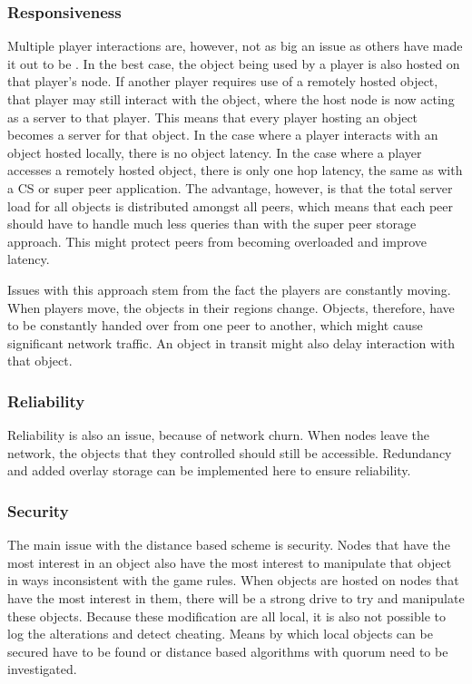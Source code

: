 \documentclass[10pt,a4paper,journal,cspaper,compsoc]{IEEEtran}
\begin{document}
\subsubsection{Responsiveness}
Multiple player interactions are, however, not as big an issue as others have made it out to be \cite{Fan_deisgn_issues_p2p}. In the best case, the
object being used by a player is also hosted on that player's node. If another player requires use of a remotely hosted object, that player may still
interact with the object, where the host node is now acting as a server to that player. This means that every player hosting an object becomes a
server for that object. In the case where a player interacts with an object hosted locally, there is no object latency. In the case where a player
accesses a remotely hosted object, there is only one hop latency, the same as with a \ac{CS} or super peer application. The advantage, however, is
that the total server load for all objects is distributed amongst all peers, which means that each peer should have to handle much less queries than
with the super peer storage approach. This might protect peers from becoming overloaded and improve latency.

Issues with this approach stem from the fact the players are constantly moving. When players move, the objects in their regions change. Objects,
therefore, have to be constantly handed over from one peer to another, which might cause significant network traffic. An object in transit might also
delay interaction with that object.

\subsubsection{Reliability}
Reliability is also an issue, because of network churn. When nodes leave the network, the objects that they controlled should still be accessible.
Redundancy and added overlay storage can be implemented here to ensure reliability.

\subsubsection{Security}
\label{distance_based_storage_security}

The main issue with the distance based scheme is security. Nodes that have the most interest in an object also have the most interest to manipulate
that object in ways inconsistent with the game rules. When objects are hosted on nodes that have the most interest in them, there will be a strong
drive to try and manipulate these objects. Because these modification are all local, it is also not possible to log the alterations and detect
cheating. Means by which local objects can be secured have to be found or distance based algorithms with quorum need to be investigated.
\end{document}
